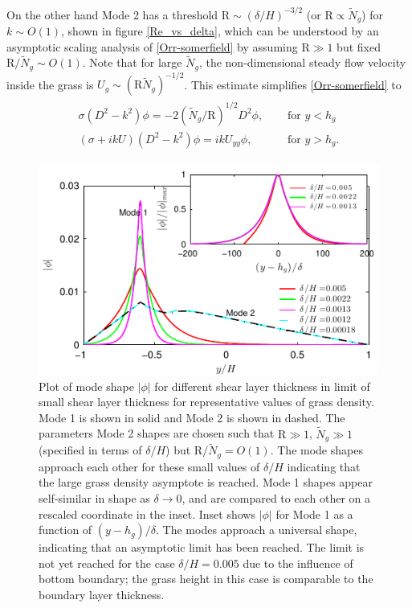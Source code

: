 \documentclass[aps,prl,twocolumn,superscriptaddress,10pt]{revtex4-1}  %
\newcommand{\hg}{h_g}
\newcommand{\Rey}{\text{R}}
\newcommand{\Ndg}{\tilde{N}_g}
\begin{document}
On the other hand Mode 2 has a threshold $\Rey \sim ({\delta}/{H})^{-3/2}$ (or $\Rey \propto \Ndg$) for $k\sim O(1)$, shown in figure \ref{Re_vs_delta}, which can be understood by an asymptotic scaling analysis of \eqref{Orr-somerfield} by assuming $\Rey \gg 1$ but fixed $\Rey/\Ndg \sim O(1)$.
Note that for large $\Ndg$, the non-dimensional steady flow velocity inside the grass is $U_g \sim (\Rey \Ndg)^{-1/2}$. 
This estimate simplifies \eqref{Orr-somerfield} to 
\begin{align}
\begin{split}
\sigma\left(D^2-k^2\right)\phi = -2{(\Ndg/\Rey)^{1/2}}D^2\phi,  \quad &\text{ for $y<\hg$}  \\
\left(\sigma+ikU\right) \left(D^2-k^2\right)\phi =  ikU_{yy}\phi, \quad &\text{ for $y>\hg$}.
\end{split}
\end{align}
\begin{figure}
\includegraphics[]{Asymptotic_noshear}
\caption{Plot of mode shape $|\phi|$ for different shear layer thickness in limit of small shear layer thickness for representative values of grass density. 
Mode 1 is shown in solid and Mode 2 is shown in dashed. The parameters Mode 2 shapes are chosen such that $\Rey \gg 1$, $\Ndg \gg 1$ (specified in terms of $\delta/H$) but $\Rey/\Ndg = O(1)$. 
The mode shapes approach each other for these small values of $\delta/H$ indicating that the large grass density asymptote is reached. Mode 1 shapes appear self-similar in shape as $\delta\to 0$, 
and are compared to each other on a rescaled coordinate in the inset. 
Inset shows $|\phi|$ for Mode 1 as a function of $(y-\hg)/\delta$. The modes approach a universal shape, indicating that an asymptotic limit has been reached. 
The limit is not yet reached for the case $\delta/H = 0.005$ due to the influence of bottom boundary; the grass height in this case is comparable to the boundary layer thickness.}
\label{Asymptotic_mode}
\end{figure}
\end{document}
